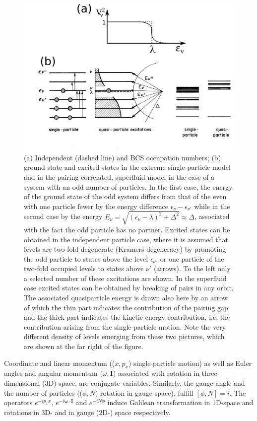 \begin{figure}
	\centerline {
		\includegraphics*[width=15cm, angle=0.]{introduccion/figs/fig0_4_4_v2}
	}
	\caption{(a) Independent (dashed line) and BCS occupation numbers; (b) ground state and excited states in the extreme single-particle model and in the pairing-correlated, superfluid model in the case of a system with an odd number of particles. In the first case, the energy of the ground state of the odd system differs from that of the even with one particle fewer by the energy difference $\epsilon_\nu-\epsilon_{\nu'}$ while in the second case by the energy $E_\nu=\sqrt{(\epsilon_\nu-\lambda)^2+\Delta^2}\approx\Delta$, associated with the fact the odd particle has no partner. Excited states can be obtained in the independent particle case, where it is assumed that levels are two-fold degenerate (Kramers degeneracy) by promoting the odd particle to states above the level $\epsilon_\nu$, or one particle of the two-fold occupied levels to  states above  $\nu'$ (arrows). To the left only a selected number of these excitations are shown. In the superfluid case excited states can be obtained by breaking of pairs in any orbit. The associated quasiparticle energy is drawn also here by an arrow of which the thin part indicates the contribution of the pairing gap and the thick part indicates the kinetic energy contribution, i.e. the contribution arising from the single-particle motion. Note the very different density of levels emerging from these two pictures, which are shown at the far right of the figure.}
	\label{fig0.4.3}
\end{figure}

Coordinate and linear momentum (($x,p_x$) single-particle motion) as well as Euler angles and angular momentum ($\omega,\mathbf I$) associated with rotation in three-dimensional (3D)-space,  are conjugate variables. Similarly, the gauge angle and the number of particles (($\phi,N$) rotation in gauge space), fulfill $[\phi,N]=i$. The operators $e^{-ip_xx}$, $e^{-i\pmb\omega\cdot\mathbf I}$ and $e^{-iN\phi}$ induce Galilean transformation in 1D-space and rotations in 3D- and in gauge (2D-) space respectively. 

